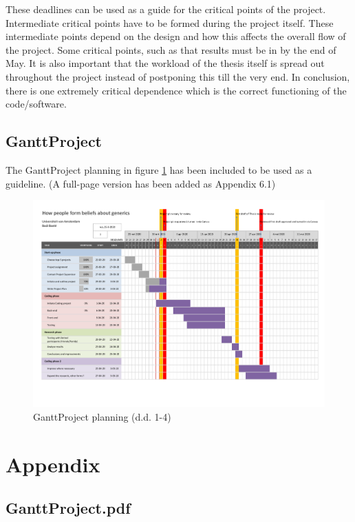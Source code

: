 \documentclass{uva-inf-article}
\begin{document}
These deadlines can be used as a guide for the critical points of the project. Intermediate critical points have to be formed during the project itself. These intermediate points depend on the design and how this affects the overall flow of the project. Some critical points, such as that results must be in by the end of May. It is also important that the workload of the thesis itself is spread out throughout the project instead of postponing this till the very end. 
In conclusion, there is one extremely critical dependence which is the correct functioning of the code/software.

\subsection{GanttProject}
The GanttProject planning in figure \ref{fig:planning} has been included to be used as a guideline. (A full-page version has been added as Appendix 6.1)
\begin{figure}[H]
 \centering
 \includegraphics[page=1,width=1.1\textwidth]{Project/ProjectPlan/Gant_planning_Afstudeerproject.pdf}
 \caption{GanttProject planning (d.d. 1-4)}
 \label{fig:planning}
\end{figure}

\printbibliography

\section{Appendix}
\subsection{GanttProject.pdf}

\end{document}
